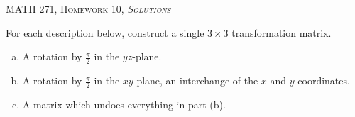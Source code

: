 \documentclass[12pt]{article} %
\begin{document}
\begin{center}
   \textsc{\large MATH 271, Homework 10, \emph{Solutions}}\\
\end{center}
\vspace{.5cm}

\begin{problem}
For each description below, construct a single $3\times 3$ transformation matrix.
\begin{enumerate}[(a)]
    \item A rotation by $\frac{\pi}{2}$ in the $yz$-plane.
    \item A rotation by $\frac{\pi}{2}$ in the $xy$-plane, an interchange of the $x$ and $y$ coordinates.
    \item A matrix which undoes everything in part (b).
\end{enumerate}
\end{problem}
\end{document}
